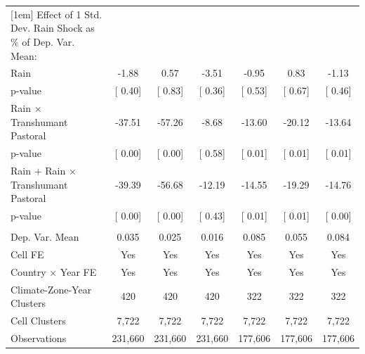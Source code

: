 {\begin{tabular}{l*{6}{c}}
[1em] Effect of 1 Std. Dev. Rain Shock as $\%$ of Dep. Var. Mean:&               &               &               &               &               &               \\
\hspace{15pt} Rain  & -1.88         &  0.57         & -3.51         & -0.95         &  0.83         & -1.13         \\
\hspace{15pt} p-value&[     0.40]         &[     0.83]         &[     0.36]         &[     0.53]         &[     0.67]         &[     0.46]         \\
[1em] \hspace{15pt} Rain $\times$ Transhumant Pastoral&-37.51         &-57.26         & -8.68         &-13.60         &-20.12         &-13.64         \\
\hspace{15pt} p-value&[     0.00]         &[     0.00]         &[     0.58]         &[     0.01]         &[     0.01]         &[     0.01]         \\
[1em]  \hspace{15pt} Rain $+$ Rain $\times$ Transhumant Pastoral&-39.39         &-56.68         &-12.19         &-14.55         &-19.29         &-14.76         \\
\hspace{15pt} p-value&[     0.00]         &[     0.00]         &[     0.43]         &[     0.01]         &[     0.01]         &[     0.00]         \\
\hline \\ Dep. Var. Mean& 0.035         & 0.025         & 0.016         & 0.085         & 0.055         & 0.084         \\
Cell FE             &   Yes         &   Yes         &   Yes         &   Yes         &   Yes         &   Yes         \\
Country $\times$ Year FE&   Yes         &   Yes         &   Yes         &   Yes         &   Yes         &   Yes         \\
Climate-Zone-Year Clusters&   420         &   420         &   420         &   322         &   322         &   322         \\
Cell Clusters       & 7,722         & 7,722         & 7,722         & 7,722         & 7,722         & 7,722         \\
Observations        &231,660         &231,660         &231,660         &177,606         &177,606         &177,606         \\
\bottomrule
\end{tabular}
}
